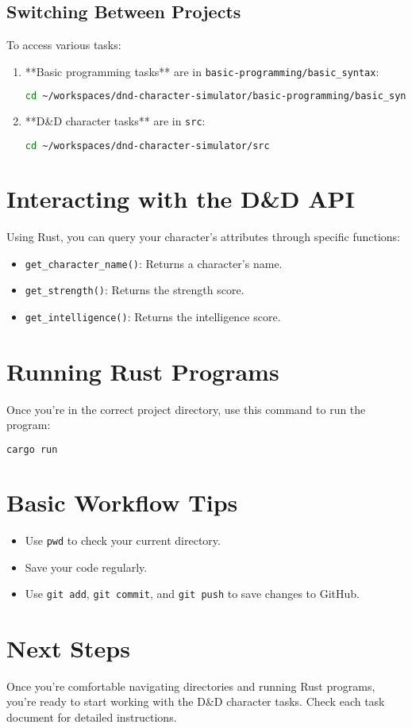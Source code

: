 \documentclass{article}
\begin{document}
	\subsection*{Switching Between Projects}
	To access various tasks:
	\begin{enumerate}
		\item **Basic programming tasks** are in \texttt{basic-programming/basic\_syntax}:
		\begin{lstlisting}[language=bash]
			cd ~/workspaces/dnd-character-simulator/basic-programming/basic_syntax
		\end{lstlisting}
		
		\item **D\&D character tasks** are in \texttt{src}:
		\begin{lstlisting}[language=bash]
			cd ~/workspaces/dnd-character-simulator/src
		\end{lstlisting}
	\end{enumerate}
	
	\section*{Interacting with the D\&D API}
	Using Rust, you can query your character’s attributes through specific functions:
	\begin{itemize}
		\item \texttt{get\_character\_name()}: Returns a character’s name.
		\item \texttt{get\_strength()}: Returns the strength score.
		\item \texttt{get\_intelligence()}: Returns the intelligence score.
	\end{itemize}
	
	\section*{Running Rust Programs}
	Once you’re in the correct project directory, use this command to run the program:
	\begin{lstlisting}[language=bash]
		cargo run
	\end{lstlisting}
	
	\section*{Basic Workflow Tips}
	\begin{itemize}
		\item Use \texttt{pwd} to check your current directory.
		\item Save your code regularly.
		\item Use \texttt{git add}, \texttt{git commit}, and \texttt{git push} to save changes to GitHub.
	\end{itemize}
	
	\section*{Next Steps}
	Once you’re comfortable navigating directories and running Rust programs, you’re ready to start working with the D\&D character tasks. Check each task document for detailed instructions.
	
\end{document}
